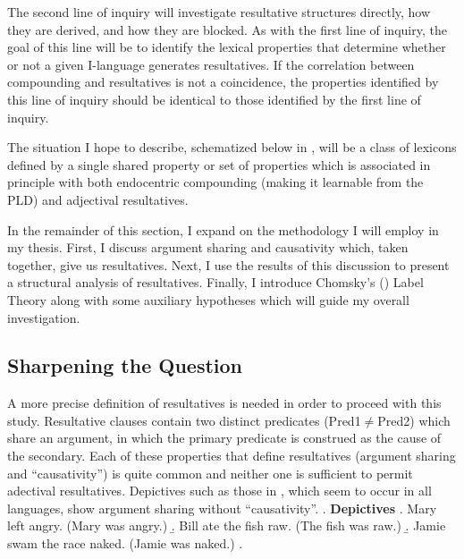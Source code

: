 \documentclass[letterpaper,12pt]{article}
\newcommand{\figex}{\refstepcounter{ExNo}\theExNo\hspace{\Exlabelsep}}
\begin{document}
The second line of inquiry will investigate resultative structures directly, how they are derived, and how they are blocked.
As with the first line of inquiry, the goal of this line will be to identify the lexical properties that determine whether or not a given I-language generates resultatives.
If the correlation between compounding and resultatives is not a coincidence, the properties identified by this line of inquiry should be identical to those identified by the first line of inquiry.

The situation I hope to describe, schematized below in \Next,  will be a class of lexicons defined by a single shared property or set of properties which is associated in principle with both endocentric compounding (making it learnable from the PLD) and adjectival resultatives. 
\begin{figure}[h]
  \figex
  \label{fig:ParameterModel}
\end{figure}

In the remainder of this section, I expand on the methodology I will employ in my thesis.
First, I discuss argument sharing and causativity which, taken together, give us resultatives.
Next, I use the results of this discussion to present a structural analysis of resultatives.
Finally, I introduce Chomsky's (\citeyear{chomsky2013problems,chomsky2015problems}) Label Theory along with some auxiliary hypotheses which will guide my overall investigation.

\subsection{Sharpening the Question}\label{sec:result analysis}
A more precise definition of resultatives is needed in order to proceed with this study.
Resultative clauses  contain two distinct predicates (Pred1$\neq$Pred2) which share an argument, in which the primary predicate is construed as the cause of the secondary.
Each of these properties that define resultatives (argument sharing and ``causativity'') is quite common and neither one is sufficient to permit adectival resultatives.
Depictives such as those in \Next, which seem to occur in all languages, show argument sharing without ``causativity''.
\ex. \textbf{Depictives}
\a. Mary left angry. (Mary was angry.)
\b. Bill ate the fish raw. (The fish was raw.)
\b. Jamie swam the race naked. (Jamie was naked.)
\z.
\end{document}
